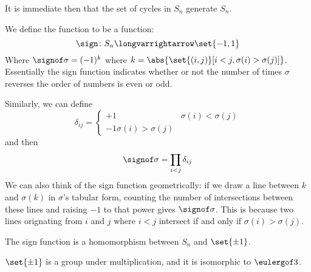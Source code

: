 \documentclass[10pt]{article}
\begin{document}
It is immediate then that the set of cycles in $S_n$ generate $S_n$.

\begin{defn*}

    We define the  function to be a function:
    \[ \sign\colon S_n\longvarrightarrow\set{-1,1} \]
    Where $\signof\sigma=(-1)^k$ where $k=\abs{\set{(i,j)}[i<j, \sigma(i)>\sigma(j)]}$.
    Essentially the sign function indicates whether or not the number of times $\sigma$ reverses the order of numbers is even or odd.

\end{defn*}

Similarly, we can define
\[ \delta_{ij} = \begin{cases} +1 & \sigma(i)<\sigma(j) \\ -1 \sigma(i)>\sigma(j) \end{cases} \]
and then
\[ \signof\sigma = \prod_{i<j}\delta_{ij} \]
We can also think of the sign function geometrically: if we draw a line between $k$ and $\sigma(k)$ in $\sigma$'s tabular form, counting the number of intersections between these lines and raising $-1$ to
that power gives $\signof\sigma$.
This is because two lines orignating from $i$ and $j$ where $i<j$ intersect if and only if $\sigma(i)>\sigma(j)$.

\begin{prop*}

    The sign function is a homomorphism between $S_n$ and $\set{\pm1}$.

\end{prop*}

$\set{\pm1}$ is a group under multiplication, and it is isomorphic to $\eulergof 3$.
\end{document}
